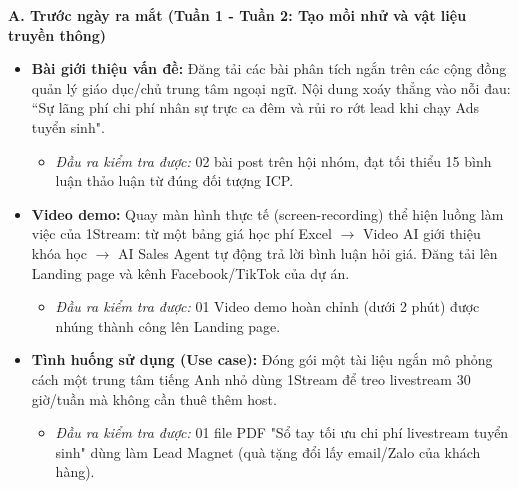 \textbf{A. Trước ngày ra mắt (Tuần 1 - Tuần 2: Tạo mồi nhử và vật liệu truyền thông)}
\begin{itemize}
    \item \textbf{Bài giới thiệu vấn đề:} Đăng tải các bài phân tích ngắn trên các cộng đồng quản lý giáo dục/chủ trung tâm ngoại ngữ. Nội dung xoáy thẳng vào nỗi đau: ``Sự lãng phí chi phí nhân sự trực ca đêm và rủi ro rớt lead khi chạy Ads tuyển sinh".
    \begin{itemize}
        \item \textit{Đầu ra kiểm tra được:} 02 bài post trên hội nhóm, đạt tối thiểu 15 bình luận thảo luận từ đúng đối tượng ICP.
    \end{itemize}
    \item \textbf{Video demo:} Quay màn hình thực tế (screen-recording) thể hiện luồng làm việc của 1Stream: từ một bảng giá học phí Excel $\rightarrow$ Video AI giới thiệu khóa học $\rightarrow$ AI Sales Agent tự động trả lời bình luận hỏi giá. Đăng tải lên Landing page và kênh Facebook/TikTok của dự án.
    \begin{itemize}
        \item \textit{Đầu ra kiểm tra được:} 01 Video demo hoàn chỉnh (dưới 2 phút) được nhúng thành công lên Landing page.
    \end{itemize}
    \item \textbf{Tình huống sử dụng (Use case):} Đóng gói một tài liệu ngắn mô phỏng cách một trung tâm tiếng Anh nhỏ dùng 1Stream để treo livestream 30 giờ/tuần mà không cần thuê thêm host.
    \begin{itemize}
        \item \textit{Đầu ra kiểm tra được:} 01 file PDF "Sổ tay tối ưu chi phí livestream tuyển sinh" dùng làm Lead Magnet (quà tặng đổi lấy email/Zalo của khách hàng).
    \end{itemize}
\end{itemize}

